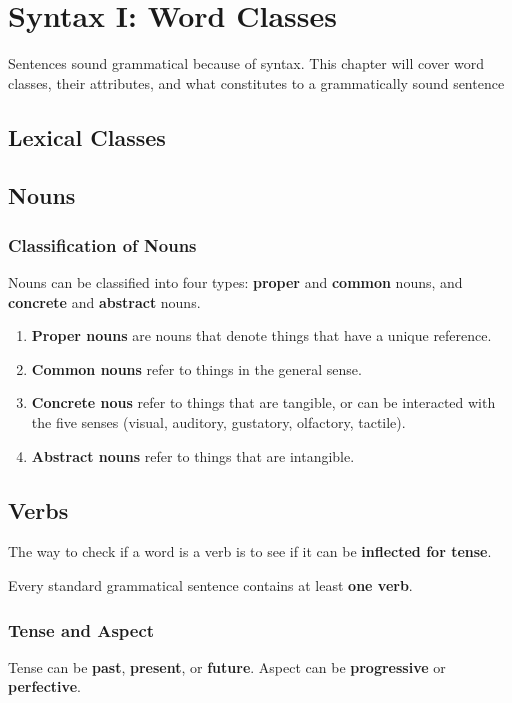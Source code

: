 \documentclass[../main.tex]{subfiles}
\begin{document}
	\section{Syntax I: Word Classes}
	\begin{preamb}
		Sentences sound grammatical because of syntax. This chapter will cover word classes, their attributes, and what constitutes to a grammatically sound sentence
	\end{preamb}
	\subsection*{Lexical Classes}
	\subsection{Nouns}
	
	\subsubsection{Classification of Nouns}
	Nouns can be classified into four types: \textbf{proper} and \textbf{common} nouns, and \textbf{concrete} and \textbf{abstract} nouns.
	
	\begin{enumerate}
		\item \textbf{Proper nouns} are nouns that denote things that have a unique reference. 
		\item \textbf{Common nouns} refer to things in the general sense.
		\item \textbf{Concrete nous} refer to things that are tangible, or can be interacted with the five senses (visual, auditory, gustatory, olfactory, tactile).
		\item \textbf{Abstract nouns} refer to things that are intangible.
	\end{enumerate}

	\subsection{Verbs}
	The way to check if a word is a verb is to see if it can be \textbf{inflected for tense}. 
	
	Every standard grammatical sentence contains at least \textbf{one verb}.
	
	\subsubsection{Tense and Aspect}
	Tense can be \textbf{past}, \textbf{present}, or \textbf{future}.
	Aspect can be \textbf{progressive} or \textbf{perfective}.
	
\end{document}
